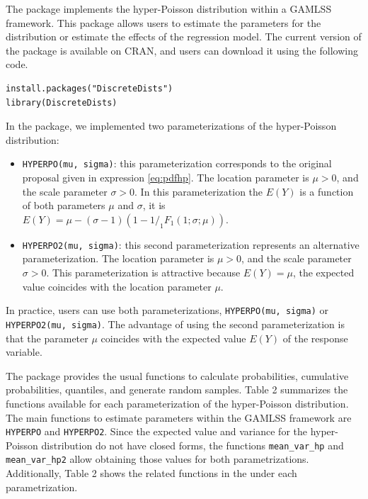The  package implements the hyper-Poisson distribution within a GAMLSS framework. This package allows users to estimate the parameters for the distribution or estimate the effects of the regression model. The current version of the package is available on CRAN, and users can download it using the following code.

\begin{verbatim}
install.packages("DiscreteDists")
library(DiscreteDists)
\end{verbatim}

In the  package, we implemented two parameterizations of the hyper-Poisson distribution:

\begin{itemize}
\tightlist
\item
  \texttt{HYPERPO(mu,\ sigma)}: this parameterization corresponds to the original proposal given in expression \eqref{eq:pdfhp}. The location parameter is \(\mu>0\), and the scale parameter \(\sigma>0\). In this parameterization the \(E(Y)\) is a function of both parameters \(\mu\) and \(\sigma\), it is \(E(Y)=\mu-(\sigma-1)(1-1/_1F_1(1;\sigma;\mu))\).
\item
  \texttt{HYPERPO2(mu,\ sigma)}: this second parameterization represents an alternative parameterization. The location parameter is \(\mu>0\), and the scale parameter \(\sigma>0\). This parameterization is attractive because \(E(Y)=\mu\), the expected value coincides with the location parameter \(\mu\).
\end{itemize}

In practice, users can use both parameterizations, \texttt{HYPERPO(mu,\ sigma)} or \texttt{HYPERPO2(mu,\ sigma)}. The advantage of using the second parameterization is that the parameter \(\mu\) coincides with the expected value \(E(Y)\) of the response variable.

The  package provides the usual functions to calculate probabilities, cumulative probabilities, quantiles, and generate random samples. Table 2 summarizes the functions available for each parameterization of the hyper-Poisson distribution. The main functions to estimate parameters within the GAMLSS framework are \texttt{HYPERPO} and \texttt{HYPERPO2}. Since the expected value and variance for the hyper-Poisson distribution do not have closed forms, the functions \texttt{mean\_var\_hp} and \texttt{mean\_var\_hp2} allow obtaining those values for both parametrizations. Additionally, Table 2 shows the related functions in the  under each parametrization.

